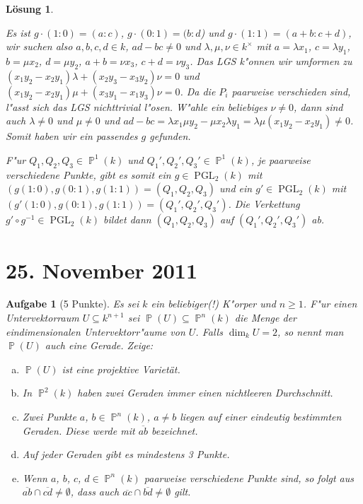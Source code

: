 \documentclass[a4paper, 12pt, numbers=noendperiod, chapterprefix=true]{scrbook}
\theoremstyle{break}
\newtheorem{Aufg}{Aufgabe}
\newtheorem{Loes}{L\"osung}
\theoremstyle{nonumberbreak}
\theoremstyle{nonumberplain}
\DeclareMathOperator{\PGL}{PGL} %
\newcommand{\A}{\mathbb{A}}
\DeclareMathOperator{\Projective}{\mathbb{P}} %
\begin{document}
\begin{Loes}
\begin{enumerate}[a)]
	Es ist $g \cdot (1:0)  = (a:c)$, $g\cdot (0:1) = (b:d$) und $g \cdot (1:1) = (a+b:c+d)$, wir suchen also $a,b,c,d \in k$, $ad-bc \neq 0$ und $\lambda, \mu, \nu \in k^\times$ mit $a = \lambda x_1$, $c = \lambda y_1$, $b = \mu x_2$, $d = \mu y_2$, $a+b = \nu x_3$, $c+d = \nu y_3$. Das LGS k"onnen wir umformen zu $(x_1y_2-x_2y_1) \lambda + (x_2y_3-x_3y_2) \nu = 0$ und $(x_1y_2-x_2y_1) \mu + (x_3y_1-x_1y_3) \nu = 0$. Da die $P_i$ paarweise verschieden sind, l"asst sich das LGS nichttrivial l"osen. W"ahle ein beliebiges $\nu \neq 0$, dann sind auch $\lambda \neq 0$ und $\mu \neq 0$ und $ad-bc = \lambda x_1\mu y_2-\mu x_2\lambda y_1 = \lambda \mu(x_1y_2-x_2y_1) \neq 0$. Somit haben wir ein passendes $g$ gefunden.
	
	F"ur $Q_1, Q_2, Q_3 \in \Projective^1(k)$ und $Q_1', Q_2', Q_3' \in \Projective^1(k)$, je paarweise verschiedene Punkte, gibt es somit ein $g \in \PGL_2(k)$ mit $(g(1:0), g(0:1), g(1:1)) = (Q_1, Q_2, Q_3)$ und ein $g' \in \PGL_2(k)$ mit $(g'(1:0), g(0:1), g(1:1)) = (Q_1', Q_2', Q_3')$. Die Verkettung $g' \circ g^{-1} \in \PGL_2(k)$ bildet dann $(Q_1, Q_2, Q_3)$ auf $(Q_1', Q_2', Q_3')$ ab.
\end{enumerate}\end{Loes}

\newpage
\section{25. November 2011}
\setcounter{Aufg}{0}
\setcounter{Loes}{0}

\begin{Aufg}[5 Punkte]
Es sei $k$ ein beliebiger(!) K"orper und $n\geq 1$. F"ur einen Untervektorraum $U\subseteq k^{n+1}$ sei $\Projective(U)\subseteq \Projective^n(k)$ die Menge der eindimensionalen Untervektorr"aume von $U$. Falls $\dim_k U = 2$, so nennt man $\Projective(U)$ auch eine \emph{Gerade}. Zeige:
\begin{enumerate}[a)]
	\item $\Projective(U)$ ist eine projektive Variet\"at.
	\item In $\Projective^2(k)$ haben zwei Geraden immer einen nichtleeren Durchschnitt.
	\item Zwei Punkte $a$, $b\in \Projective^n(k)$, $a\neq b$ liegen auf einer eindeutig bestimmten Geraden. Diese werde mit $\overline{ab}$ bezeichnet.
	\item Auf jeder Geraden gibt es mindestens 3 Punkte.
	\item Wenn $a$, $b$, $c$, $d\in \Projective^n(k)$ paarweise verschiedene Punkte sind, so folgt aus $\overline{ab}\cap \overline{cd} \neq \emptyset$, dass auch $\overline{ac}\cap \overline{bd} \neq \emptyset$ gilt.
\end{enumerate}
\end{Aufg}
\end{document}
